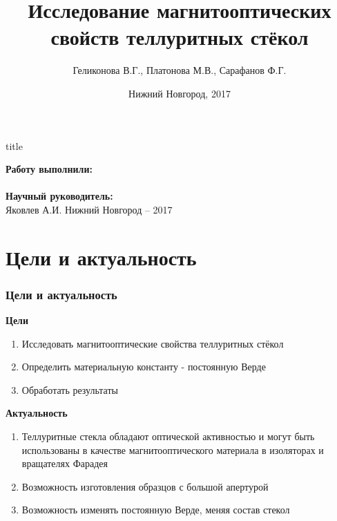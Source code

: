 \documentclass[10pt,pdf,hyperref={unicode}, dvipsnames, handout]{beamer}
\begin{document}
  

\title[Магнитооптическая активность теллуритных стёкол]{Исследование магнитооптических свойств теллуритных стёкол}
\author{%
	Геликонова В.Г., %
	Платонова М.В., %
	Сарафанов Ф.Г. %
}
\date{Нижний Новгород, 2017}

\begin{frame}[plain]
	\centering
	\vspace{2cm}
	\begin{beamercolorbox}[sep=8pt,center]{title}
		\bf{}\inserttitle
	\end{beamercolorbox}
	\vspace{0.5cm}
	\normalsize \textbf{Работу выполнили:}\\
	\large\insertauthor\\ 
	\vspace{0.5cm}
	\normalsize{\textbf{Научный руководитель:}\\}
	\large{Яковлев А.И.}
	\vfill
	\small{Нижний Новгород -- 2017}
\end{frame}
\section{Цели и актуальность}
\begin{frame}[t]
	\frametitle{Цели и актуальность}
	\textbf{Цели}\\
	\begin{enumerate}
		\item Исследовать магнитооптические свойства теллуритных стёкол
		\item Определить материальную константу - постоянную Верде
		\item Обработать результаты
	\end{enumerate}
	\textbf{Актуальность}\\
	\begin{enumerate}
		\item Теллуритные стекла обладают оптической активностью и могут быть использованы в качестве магнитооптического материала в изоляторах и вращателях Фарадея
		\item Возможность изготовления образцов с большой апертурой
		\item Возможность изменять постоянную Верде, меняя состав стекол
	\end{enumerate}
\end{frame}
\end{document}
